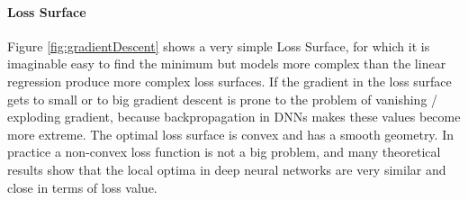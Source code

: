 \paragraph{Loss Surface}
Figure \ref{fig:gradientDescent} shows a very simple Loss Surface, for which it is imaginable easy to find the minimum but models more complex than the linear regression produce more complex loss surfaces. 
If the gradient in the loss surface gets to small or to big gradient descent is prone to the problem of vanishing / exploding gradient, because backpropagation in DNNs makes these values become more extreme.
The optimal loss surface is convex and has a smooth geometry.
In practice a non-convex loss function
is not a big problem, and many theoretical results show that the
local optima in deep neural networks are very similar and close
in terms of loss value. \cite{ValdenegroToro2019DeepNN}
